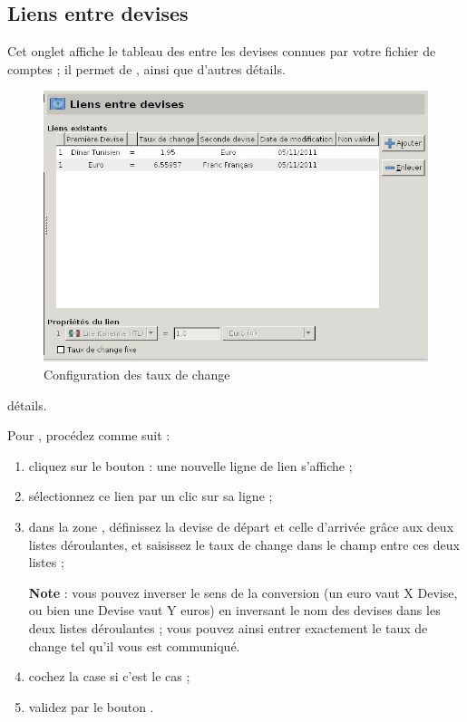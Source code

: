 \subsection{Liens entre devises\label{setup-resources-rate}}

Cet onglet affiche le tableau des   entre les devises connues par votre fichier de comptes ; il permet de , ainsi que d'autres \ifIllustration détails.
\begin{figure}[htbp]
\begin{center}
\includegraphics[scale=0.5]{image/screenshot/setup_exchangerate}
\end{center}
\caption{Configuration des taux de change}
\label{setup-exchangerate-img}
\end{figure}
\else détails.
\fi

Pour , procédez comme suit :

\begin{enumerate}
	\item cliquez sur le bouton  : une nouvelle ligne de lien s'affiche ;
	\item sélectionnez ce lien par un clic sur sa ligne ;
	\item dans la zone  , définissez la devise de départ et celle d'arrivée grâce aux deux listes déroulantes, et saisissez le taux de change dans le champ entre ces deux listes ;
	  
	  \textbf{Note} : vous pouvez inverser le sens de la conversion (un euro vaut X Devise, ou bien une Devise vaut Y euros) en inversant le nom des devises dans les deux listes déroulantes ; vous pouvez ainsi entrer exactement le taux de change tel qu'il vous est communiqué. 
	\item cochez la case  si c'est le cas ;
	\item validez par le bouton .
\end{enumerate}

